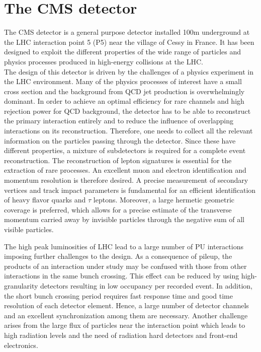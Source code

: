 \section{The CMS detector}
\label{sec:CMSdetector}

The CMS detector is a general purpose detector installed 100\unit{m} underground at the LHC interaction point 5 (P5) near the village of Cessy in France.
It has been designed to exploit the different properties of the wide range of particles and physics processes produced in high-energy collisions at the LHC.\\

The design of this detector is driven by the challenges of a physics experiment in the LHC environment. 
Many of the physics processes of interest have a small cross section and the background from QCD jet production is overwhelmingly dominant.
In order to achieve an optimal efficiency for rare channels and high rejection power for QCD background, the detector has to be able to reconstruct the primary interaction entirely
and to reduce the influence of overlapping interactions on its reconstruction.
Therefore, one needs to collect all the relevant information on the particles passing through the detector. Since these have different properties, a mixture of subdetectors is required for a complete event reconstruction. The reconstruction of lepton signatures is essential for the extraction of rare processes. An excellent muon and electron identification and momentum resolution is therefore desired. A precise measurement of secondary vertices and track impact parameters is fundamental for an efficient identification of heavy flavor quarks and $\tau$ leptons. Moreover, a large hermetic geometric coverage is preferred, which allows for a precise estimate of the transverse momentum carried away by invisible particles through the negative sum of all visible particles.

The high peak luminosities of LHC lead to a large number of PU interactions imposing further challenges to the design. As a consequence of pileup, the products of an interaction under study may be confused with those from other interactions in the same bunch crossing. This effect can be reduced by using high-granularity detectors resulting in low occupancy per recorded event. In addition, the short bunch crossing period requires fast response time and good time resolution of each detector element.
Hence, a large number of detector channels and an excellent synchronization among them are necessary. Another challenge arises from the large flux of particles near the interaction point which leads to high radiation levels and the need of radiation hard detectors and front-end electronics.\\

